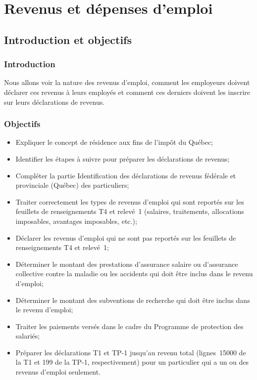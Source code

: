 \chapter{Revenus et dépenses d'emploi}
\section{Introduction et objectifs}
\subsection{Introduction}
Nous allons voir la nature des revenus d'emploi, comment les employeurs doivent déclarer ces revenus à leurs employés et comment ces derniers doivent les inscrire sur leurs déclarations de revenus.


\subsection{Objectifs}
\begin{itemize}
	\item Expliquer le concept de résidence aux fins de l'impôt du Québec; 
	\item Identifier les étapes à suivre pour préparer les déclarations de revenus;
	\item Compléter la partie \og Identification\fg{} des déclarations de revenus fédérale et provinciale (Québec) des particuliers;
	\item Traiter correctement les types de revenus d'emploi qui sont reportés sur les feuillets de renseignements T4 et relevé~1 (salaires, traitements, allocations imposables, avantages imposables, etc.);
	\item Déclarer les revenus d'emploi qui ne sont pas reportés sur les feuillets de renseignements T4 et relevé~1;
	\item Déterminer le montant des prestations d'assurance salaire ou d'assurance collective contre la maladie ou les accidents qui doit être inclus dans le revenu d'emploi;
	\item Déterminer le montant des subventions de recherche qui doit être inclus dans le revenu d'emploi;
	\item Traiter les paiements versés dans le cadre du Programme de protection des salariés;
	\item Préparer les déclarations T1 et TP-1 jusqu'au revenu total (lignes~15000 de la T1 et 199 de la TP-1, respectivement) pour un particulier qui a un ou des revenus d'emploi seulement.
\end{itemize}


